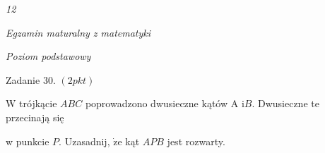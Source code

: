 \documentclass[a4paper,12pt]{article}
\begin{document}
{\it 12}

{\it Egzamin maturalny z matematyki}

{\it Poziom podstawowy}

Zadanie 30. $(2pkt)$

$\mathrm{W}$ trójkącie $ABC$ poprowadzono dwusieczne kątów A $\mathrm{i}B$. Dwusieczne te przecinają się

w punkcie $P$. Uzasadnij, $\dot{\mathrm{z}}\mathrm{e}$ kąt $APB$ jest rozwarty.
\end{document}
